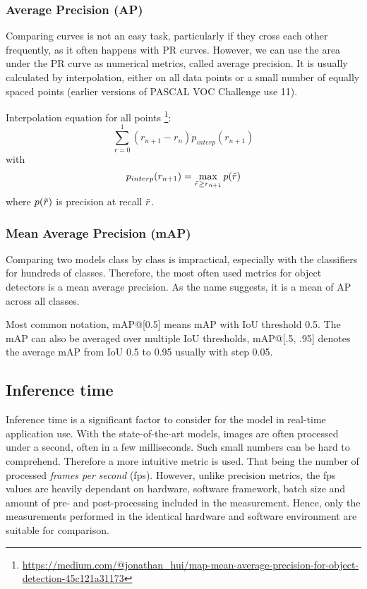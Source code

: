\subsubsection{Average Precision (AP)}
Comparing curves is not an easy task, particularly if they cross each other frequently, as it often happens with PR curves. However, we can use the area under the PR curve as numerical metrics, called average precision. It is usually calculated by interpolation, either on all data points or a small number of equally spaced points (earlier versions of PASCAL VOC Challenge use 11).

Interpolation equation for all points \footnote{\url{https://medium.com/@jonathan\_hui/map-mean-average-precision-for-object-detection-45c121a31173}}:
$$\sum_{r=0}^1 (r_{n+1} - r_n ) p_{interp}(r_{n+1})$$
with
$$p_{interp}(r_{n+1}) = \max_{\Tilde{r} \geq r_{n+1}} p(\Tilde{r})$$
where $p(\Tilde{r})$ is precision at recall $\Tilde{r}$.

\subsubsection{Mean Average Precision (mAP)}
Comparing two models class by class is impractical, especially with the classifiers for hundreds of classes. Therefore, the most often used metrics for object detectors is a mean average precision. As the name suggests, it is a mean of AP across all classes.

Most common notation, mAP@[0.5] means mAP with IoU threshold 0.5. The mAP can also be averaged over multiple IoU thresholds, mAP@[.5, .95] denotes the average mAP from IoU 0.5 to 0.95 usually with step 0.05.

\subsection{Inference time}
Inference time is a significant factor to consider for the model in real-time application use. With the state-of-the-art models, images are often processed under a second, often in a few milliseconds. Such small numbers can be hard to comprehend. Therefore a more intuitive metric is used. That being the number of processed \textit{frames per second} (fps). However, unlike precision metrics, the fps values are heavily dependant on hardware, software framework, batch size and amount of pre- and post-processing included in the measurement. Hence, only the measurements performed in the identical hardware and software environment are suitable for comparison.

